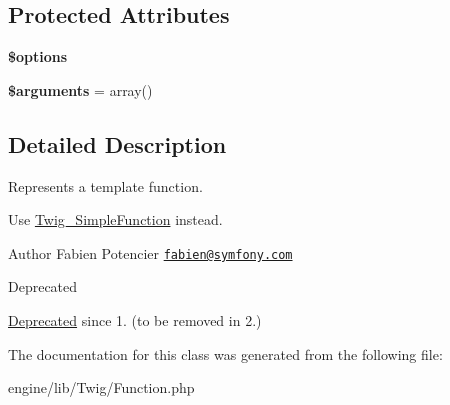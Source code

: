 \subsection*{Protected Attributes}
\begin{DoxyCompactItemize}
\item 
\hypertarget{class_twig___function_a011800c63ece4cbbfa77136a20607023}{}{\bfseries \$options}\label{class_twig___function_a011800c63ece4cbbfa77136a20607023}

\item 
\hypertarget{class_twig___function_a61eded163d962fc248b3cf209000979b}{}{\bfseries \$arguments} = array()\label{class_twig___function_a61eded163d962fc248b3cf209000979b}

\end{DoxyCompactItemize}


\subsection{Detailed Description}
Represents a template function.

Use \hyperlink{class_twig___simple_function}{Twig\+\_\+\+Simple\+Function} instead.

\begin{DoxyAuthor}{Author}
Fabien Potencier \href{mailto:fabien@symfony.com}{\tt fabien@symfony.\+com} 
\end{DoxyAuthor}
\begin{DoxyRefDesc}{Deprecated}
\item[\hyperlink{deprecated__deprecated000013}{Deprecated}]since 1. (to be removed in 2.) \end{DoxyRefDesc}


The documentation for this class was generated from the following file\+:\begin{DoxyCompactItemize}
\item 
engine/lib/\+Twig/Function.\+php\end{DoxyCompactItemize}
